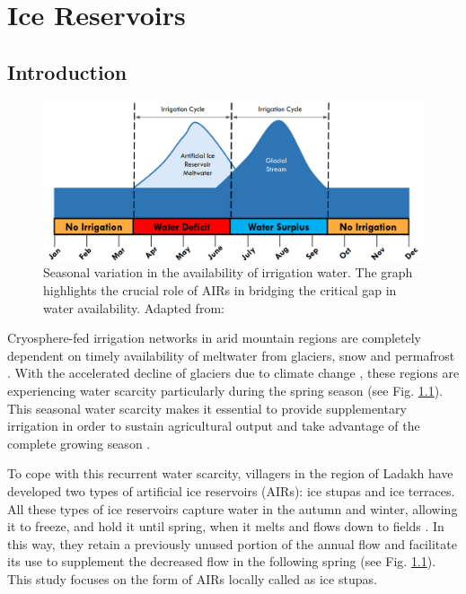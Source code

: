 \chapter{Ice Reservoirs}

\section{Introduction}

\begin{figure}[t]
\centering
\includegraphics[width=12cm]{Figures/irrigation_cycles.png}

\caption{Seasonal variation in the availability of irrigation water. The graph highlights the crucial role of
AIRs in bridging the critical gap in water availability. Adapted from: \cite{nusserLocalKnowledgeGlobal2016}}

\label{fig:irrigation_cycles}
\end{figure}

Cryosphere-fed irrigation networks in arid mountain regions are completely dependent on timely availability of
meltwater from glaciers, snow and permafrost \citep{immerzeelImportanceVulnerabilityWorld2020,
farhanHydrologicalRegimesConjunction2015, tveitenGlacierGrowingLocal2007}. With the accelerated decline of
glaciers due to climate change \citep{nusserLocalKnowledgeGlobal2016}, these regions are experiencing water
scarcity particularly during the spring season \citep{norphelSnowWaterHarvesting2015,
mukhopadhyayReevaluationSnowmeltGlacial2015} (see Fig. \ref{fig:irrigation_cycles}). This seasonal water
scarcity makes it essential to provide supplementary irrigation in order to sustain agricultural output and take
advantage of the complete growing season \citep{nusserLocalKnowledgeGlobal2016, vincentEnergyClimateChange2009}.

To cope with this recurrent water scarcity, villagers in the region of Ladakh have developed two types of
artificial ice reservoirs (AIRs): ice stupas and ice terraces.  All these types of ice reservoirs capture water
in the autumn and winter, allowing it to freeze, and hold it until spring, when it melts and flows down to
fields \citep{ipccChapterHighMountain2019, vinceGlacierMan2009, clouseLadakhArtificialGlaciers2017,
nusserSociohydrologyArtificialGlaciers2019}. In this way, they retain a previously unused portion of the annual
flow and facilitate its use to supplement the decreased flow in the following spring (see Fig.
\ref{fig:irrigation_cycles}). This study focuses on the form of AIRs locally called as ice stupas.

